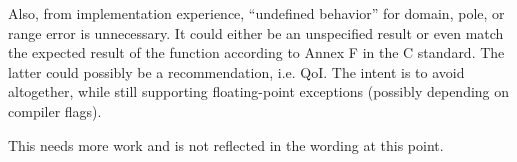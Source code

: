 Also, from implementation experience, ``undefined behavior'' for domain, pole,
or range error is unnecessary.
It could either be an unspecified result or even match the expected result of
the function according to Annex F in the C standard.
The latter could possibly be a recommendation, i.e. QoI.
The intent is to avoid  altogether, while still supporting
floating-point exceptions (possibly depending on compiler flags).

This needs more work and is not reflected in the wording at this point.

%

